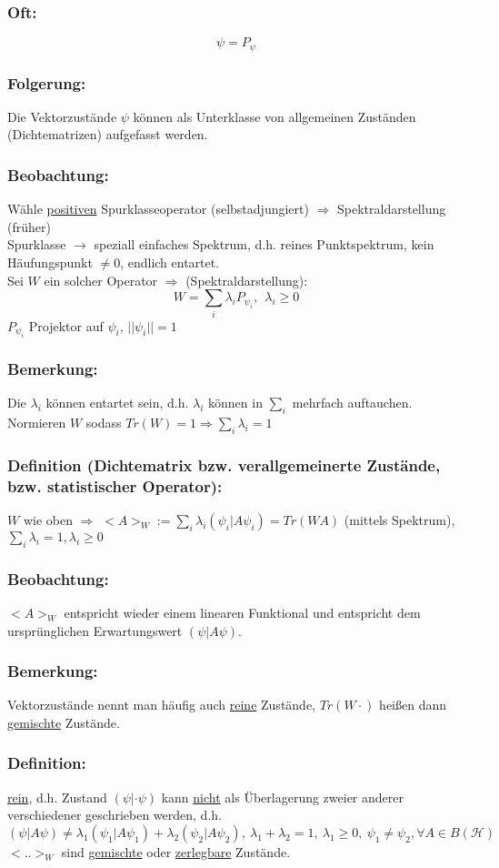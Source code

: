 \documentclass[twoside,a4paper]{scrartcl}
\renewcommand{\1}{\mathds{1}}
\newcommand{\Ra}{\Rightarrow}
\newcommand{\ra}{\rightarrow}
\renewcommand{\l}{\lambda}
\renewcommand{\H}{\mathcal{H}}
\begin{document}
\subsubsection*{Oft:}
$$\psi=P_\psi$$
\subsubsection*{Folgerung:}
Die Vektorzustände $\psi$ können als Unterklasse von allgemeinen Zuständen (Dichtematrizen) aufgefasst werden.
\subsubsection*{Beobachtung:}
Wähle \underline{positiven} Spurklasseoperator (selbstadjungiert) $\Ra$ Spektraldarstellung (früher)\\
Spurklasse $\ra$ speziall einfaches Spektrum, d.h. reines Punktspektrum, kein Häufungspunkt $\neq 0$, endlich entartet.\\
Sei $W$ ein solcher Operator $\Ra$ (Spektraldarstellung):\\
$$W=\sum_i \l_i P_{\psi_i}, \ \ \l_i\geq 0$$
$P_{\psi_i}$ Projektor auf $\psi_i$, $||\psi_i||=1$
\subsubsection*{Bemerkung:}
Die $\l_i$ können entartet sein, d.h. $\l_i$ können in $\sum_i$ mehrfach auftauchen. Normieren $W$ sodass $Tr(W)=1 \Ra \sum_i \l_i=1$
\subsubsection*{Definition (Dichtematrix bzw. verallgemeinerte Zustände, bzw. statistischer Operator):}
$W$ wie oben $\Ra$ $<A>_W:=\sum_i \l_i (\psi_i|A\psi_i)=Tr(WA)$ (mittels Spektrum), $\sum_i \l_i=1, \l_i \geq 0$
\subsubsection*{Beobachtung:}
$<A>_W$ entspricht wieder einem linearen Funktional und entspricht dem ursprünglichen Erwartungswert $(\psi|A\psi)$.
\subsubsection*{Bemerkung:}
Vektorzustände nennt man häufig auch \underline{reine} Zustände, $Tr(W \cdot)$ heißen dann \underline{gemischte} Zustände.
\subsubsection*{Definition:}
 \underline{rein}, d.h. Zustand $(\psi|\cdot \psi)$ kann \underline{nicht} als Überlagerung zweier anderer verschiedener geschrieben werden, d.h. 
$$(\psi|A\psi)\neq \l_1(\psi_1|A\psi_1)+\l_2(\psi_2|A\psi_2), \ \l_1+\l_2=1, \ \l_1 \geq 0, \ \psi_1\neq \psi_2, \forall A \in B(\H)$$
$< .. >_W$ sind \underline{gemischte} oder \underline{zerlegbare} Zustände.
\end{document}
